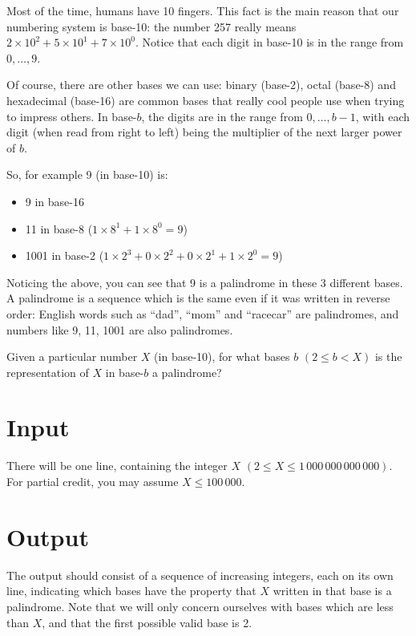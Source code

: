 Most of the time, humans have 10 fingers. This fact is the main reason that our numbering system is
base-10: the number 257 really means $2 \times 10^2 + 5 \times 10^1 + 7 \times 10^0$. Notice that
each digit in base-10 is in the range from $0, \dots,  9$.

Of course, there are other bases we can use: binary (base-2), octal (base-8) and hexadecimal
(base-16) are common bases that really cool people use when trying to impress others. In base-$b$,
the digits are in the range from $0, \dots, b - 1$, with each digit (when read from right to left)
being the multiplier of the next larger power of $b$.

So, for example 9 (in base-10) is:
\begin{itemize}
  \item 9 in base-16
  \item 11 in base-8 ($1 \times 8^1 + 1 \times 8^0 = 9$)
  \item 1001 in base-2 ($1 \times 2^3 + 0 \times 2^2 + 0 \times 2^1 + 1 \times 2^0 = 9$)
\end{itemize}

Noticing the above, you can see that 9 is a palindrome in these 3 different bases. A palindrome is
a sequence which is the same even if it was written in reverse order: English words such as “dad”,
“mom” and “racecar” are palindromes, and numbers like 9, 11, 1001 are also palindromes.

Given a particular number $X$ (in base-10), for what bases $b$ $(2 \le b < X)$ is the representation
of $X$ in base-$b$ a palindrome?

\section*{Input}
There will be one line, containing the integer $X$ $(2 \le X \le 1\,000\,000\,000\,000)$.
For partial credit, you may assume $X \le 100\,000$.

\section*{Output}
The output should consist of a sequence of increasing integers, each on its own line, indicating
which bases have the property that $X$ written in that base is a palindrome. Note that we will only
concern ourselves with bases which are less than $X$, and that the first possible valid base is 2.
